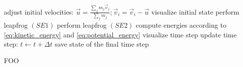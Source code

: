 \begin{algorithm}
    \begin{algorithmic}[1]
        \State adjust initial velocities: $\vec{u} = \frac{\sum_j m_j \vec{v}_j}{\sum_j m_j}; \vec{v}_i = \vec{v}_i - \vec{u}$
        \State {}
        \State visualize initial state
            \State perform leapfrog $(SE1)$
            \State {}
            \State perform leapfrog $(SE2)$
                \State compute energies according to \cref{eq:kinetic_energy} and \cref{eq:potential_energy}
                \State visualize time step
            \EndIf
            \State update time step: $t \gets t + \Delta t$
        \EndWhile
        \State save state of the final time step
    \end{algorithmic}
    \label{alg:n_body}
    \caption{A full n-body simulation}
\end{algorithm}

\begin{algorithm}
    \begin{algorithmic}[1]
            \State FOO
        \EndFunction
    \end{algorithmic}
    \label{alg:acc_naive}
    \caption{Function for updating the acceleration using the naive algorithm.}
\end{algorithm}

